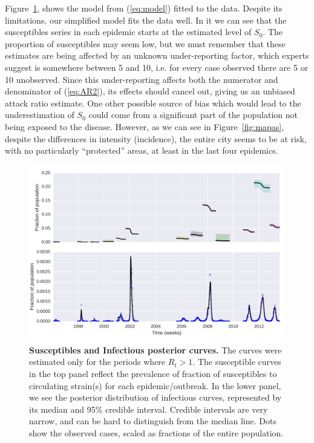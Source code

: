 \documentclass[10pt]{article}
\begin{document}
Figure~\ref{Fig:S0}, shows the model from (\ref{eq:model}) fitted to the data.
Despite its limitations, our simplified model fits the data well.
In it we can see that the susceptibles series in each epidemic starts at the 
estimated level of $S_0$.
The proportion of susceptibles may seem low, but we 
must remember that these estimates are being affected by an unknown 
under-reporting factor, which experts suggest is somewhere between 5 and 10, 
i.e. for every case observed there are 5 or 10 unobserved.
Since this under-reporting affects both the numerator and denominator of 
(\ref{eq:AR2}), its effects should cancel out, giving us an unbiased attack 
ratio estimate.
One other possible source of bias which would lead to the underestimation of 
$S_0$ could come from a significant part of the population not being exposed to 
the disease.
However, as we can see in Figure~\ref{fig:mapas}, despite the differences in 
intensity (incidence), the entire city seems to be at risk, with no 
particularly ``protected'' areas, at least in the last four epidemics. 

\begin{figure}[!ht]
\begin{center}
\includegraphics[width=\textwidth]{plots/concat_SI.png}
\end{center}
\caption{
{\bf Susceptibles and Infectious posterior curves.}  The curves were estimated 
only for the periods where $R_t> 1$.  The susceptible curves in the top panel 
reflect the prevalence of fraction of susceptibles to circulating strain(s) for 
each epidemic/outbreak.
In the lower panel, we see the posterior distribution 
of infectious curves, represented by its median and 95\% credible interval.
Credible intervals are very narrow, and can be hard to distinguish from the 
median line. 
Dots show the observed cases, scaled as fractions of the entire 
population.
}
\label{Fig:S0}
\end{figure}
\end{document}
